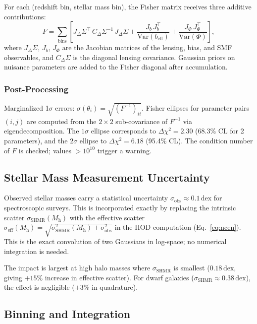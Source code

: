 \documentclass[12pt, letterpaper]{article}
\newcommand{\Mh}{M_\mathrm{h}}
\newcommand{\DS}{\Delta\Sigma}
\newcommand{\seff}{\sigma_\mathrm{eff}}
\newcommand{\sobs}{\sigma_\mathrm{obs}}
\newcommand{\sSHMR}{\sigma_\mathrm{SHMR}}
\begin{document}
For each (redshift bin, stellar mass bin), the Fisher matrix receives
three additive contributions:
\begin{equation}
F = \sum_\mathrm{bins} \left[
    J_\DS^\top\,C_\DS^{-1}\,J_\DS
    + \frac{J_b\,J_b^\top}{\mathrm{Var}(b_\mathrm{eff})}
    + \frac{J_\Phi\,J_\Phi^\top}{\mathrm{Var}(\Phi)}
\right],
\label{eq:fisher}
\end{equation}
where $J_\DS$, $J_b$, $J_\Phi$ are the Jacobian matrices of the
lensing, bias, and SMF observables, and $C_\DS$ is the diagonal
lensing covariance.
Gaussian priors on nuisance parameters are added to the Fisher
diagonal after accumulation.


\subsubsection{Post-Processing}

Marginalized 1$\sigma$ errors:
$\sigma(\theta_i) = \sqrt{(F^{-1})_{ii}}$.
Fisher ellipses for parameter pairs $(i, j)$ are computed from the
$2\times2$ sub-covariance of $F^{-1}$ via eigendecomposition.
The $1\sigma$ ellipse corresponds to
$\Delta\chi^2 = 2.30$ (68.3\% CL for 2 parameters), and the
$2\sigma$ ellipse to $\Delta\chi^2 = 6.18$ (95.4\% CL).
The condition number of $F$ is checked; values $>10^{10}$ trigger a
warning.


\subsection{Stellar Mass Measurement Uncertainty}

Observed stellar masses carry a statistical uncertainty
$\sobs \approx 0.1\,\mathrm{dex}$ for spectroscopic surveys.
This is incorporated exactly by replacing the intrinsic scatter
$\sSHMR(\Mh)$ with the effective scatter
$\seff(\Mh) = \sqrt{\sSHMR^2(\Mh) + \sobs^2}$ in the HOD
computation (Eq.~\ref{eq:ncen}).
This is the exact convolution of two Gaussians in log-space; no
numerical integration is needed.

The impact is largest at high halo masses where $\sSHMR$ is smallest
($0.18\,\mathrm{dex}$, giving $+15\%$ increase in effective scatter).
For dwarf galaxies ($\sSHMR \approx 0.38\,\mathrm{dex}$), the effect
is negligible ($+3\%$ in quadrature).


\subsection{Binning and Integration}
\end{document}
